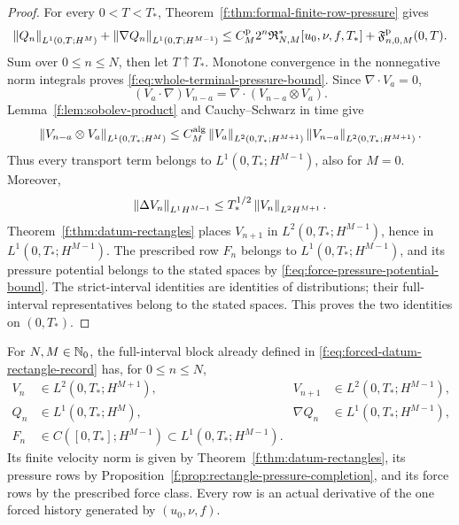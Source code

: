 \begin{proof}
For every \(0<T<T_*\),
Theorem~\ref{f:thm:formal-finite-row-pressure} gives
\[
 \left\lVert Q_n\right\rVert_{L^1(0,T;H^M)}
 +\left\lVert \nabla Q_n\right\rVert_{L^1(0,T;H^{M-1})}
 \le C_M^{\rm p}2^n\mathfrak R_{N,M}^*[u_0,\nu,f,T_*]
 +\mathfrak F^{\rm p}_{n,0,M}(0,T).
\]
Sum over \(0\le n\le N\), then let \(T\uparrow T_*\).  Monotone
convergence in the nonnegative norm integrals proves
\eqref{f:eq:whole-terminal-pressure-bound}.  Since
\(\nabla\cdot V_a=0\),
\[
 (V_a\cdot\nabla)V_{n-a}
 =\nabla\cdot(V_{n-a}\otimes V_a).
\]
Lemma~\ref{f:lem:sobolev-product} and Cauchy--Schwarz in time give
\[
 \left\lVert V_{n-a}\otimes V_a\right\rVert_{L^1(0,T_*;H^M)}
 \le C_M^{\rm alg}
 \left\lVert V_a\right\rVert_{L^2(0,T_*;H^{M+1})}
 \left\lVert V_{n-a}\right\rVert_{L^2(0,T_*;H^{M+1})}.
\]
Thus every transport term belongs to
\(L^1(0,T_*;H^{M-1})\), also for \(M=0\).  Moreover,
\[
 \left\lVert \Delta V_n\right\rVert_{L^1H^{M-1}}
 \le T_*^{1/2}\left\lVert V_n\right\rVert_{L^2H^{M+1}}.
\]
Theorem~\ref{f:thm:datum-rectangles} places \(V_{n+1}\) in
\(L^2(0,T_*;H^{M-1})\), hence in \(L^1(0,T_*;H^{M-1})\).
The prescribed row \(F_n\) belongs to \(L^1(0,T_*;H^{M-1})\), and its
pressure potential belongs to the stated spaces by
\eqref{f:eq:force-pressure-potential-bound}.
The strict-interval identities are identities of distributions; their
full-interval representatives belong to the stated spaces.  This proves the
two identities on \((0,T_*)\).
\end{proof}

\begin{definition}
\label{f:def:finite-window-space}
For \(N,M\in\mathbb N_0\), the full-interval block already defined in
\eqref{f:eq:forced-datum-rectangle-record} has, for \(0\le n\le N\),
\begin{equation}
 \begin{aligned}
 V_n&\in L^2(0,T_*;H^{M+1}),&
 V_{n+1}&\in L^2(0,T_*;H^{M-1}),\\
 Q_n&\in L^1(0,T_*;H^M),&
 \nabla Q_n&\in L^1(0,T_*;H^{M-1}),\\
 F_n&\in C([0,T_*];H^{M-1})
       \subset L^1(0,T_*;H^{M-1}).
 \end{aligned}
 \label{f:eq:whole-terminal-rectangle-element}
\end{equation}
Its finite velocity norm is given by
Theorem~\ref{f:thm:datum-rectangles}, its pressure rows by
Proposition~\ref{f:prop:rectangle-pressure-completion}, and its force rows by
the prescribed force class.  Every row is an actual derivative of the one
forced history generated by \((u_0,\nu,f)\).
\end{definition}

